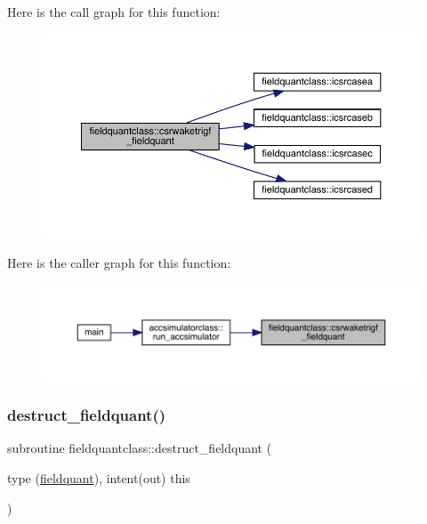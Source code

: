 Here is the call graph for this function\+:\nopagebreak
\begin{figure}[H]
\begin{center}
\leavevmode
\includegraphics[width=350pt]{namespacefieldquantclass_ac3c0238f350487871fdbe6a84bcdfc2e_cgraph}
\end{center}
\end{figure}
Here is the caller graph for this function\+:\nopagebreak
\begin{figure}[H]
\begin{center}
\leavevmode
\includegraphics[width=350pt]{namespacefieldquantclass_ac3c0238f350487871fdbe6a84bcdfc2e_icgraph}
\end{center}
\end{figure}
\mbox{\label{namespacefieldquantclass_a4e8922c1e25eef99306f4001c7289ba0}} 
\subsubsection{\texorpdfstring{destruct\_fieldquant()}{destruct\_fieldquant()}}
{\footnotesize\ttfamily subroutine fieldquantclass\+::destruct\+\_\+fieldquant (\begin{DoxyParamCaption}\item[{type (\mbox{\hyperlink{namespacefieldquantclass_structfieldquantclass_1_1fieldquant}{fieldquant}}), intent(out)}]{this }\end{DoxyParamCaption})}

